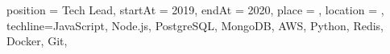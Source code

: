
\begin{placex}{%
    position = {Tech Lead},
    startAt = 2019,
    endAt = 2020,
    place = \appdome,
    location = \telaviv,
    techline={JavaScript, Node.js, PostgreSQL, MongoDB, AWS, Python,
    Redis, Docker, Git},
  }
  \AppSummaryTechLead
  \AppGuidedDevelopers
  \AppComplexTechnical
  \AppModernizedDevelopmentProcesses
  \AppMajorRefactoring
\end{placex}

